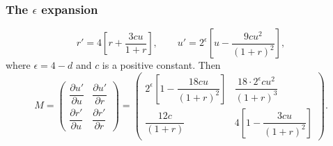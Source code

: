 \subsubsection*{The \texorpdfstring{$\epsilon$}{epsilon} expansion}

\begin{equation}
  r' = 4\left[r + \frac{3cu}{1+r}\right],\qquad
  u' = 2^\epsilon\left[u - \frac{9cu^2}{(1+r)^2}\right],
\end{equation}
where $\epsilon = 4-d$ and $c$ is a positive constant. Then
\begin{equation}
  M = \begin{pmatrix}\dfrac{\partial u'}{\partial u} & \dfrac{\partial u'}{\partial r}\\[6pt] \dfrac{\partial r'}{\partial u} & \dfrac{\partial r'}{\partial r}\end{pmatrix}
    = \begin{pmatrix}2^\epsilon\left[1-\dfrac{18cu}{(1+r)^2}\right] & \dfrac{18\cdot 2^\epsilon cu^2}{(1+r)^3}\\[12pt]
                     \dfrac{12c}{(1+r)} & 4\left[1-\dfrac{3cu}{(1+r)^2}\right]\end{pmatrix}.
\end{equation}


